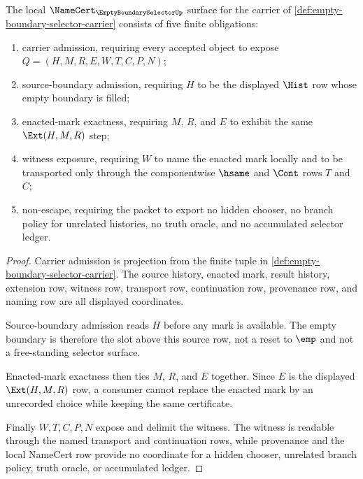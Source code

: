 \begin{theorem}
\label{thm:empty-boundary-selector-namecert-obligations}
The local $\NameCert_{\EmptyBoundarySelectorUp}$ surface for the carrier of \autoref{def:empty-boundary-selector-carrier} consists of five finite obligations:
\begin{enumerate}
\item carrier admission, requiring every accepted object to expose $Q=(H,M,R,E,W,T,C,P,N)$;
\item source-boundary admission, requiring $H$ to be the displayed $\Hist$ row whose empty boundary is filled;
\item enacted-mark exactness, requiring $M$, $R$, and $E$ to exhibit the same $\Ext(H,M,R)$ step;
\item witness exposure, requiring $W$ to name the enacted mark locally and to be transported only through the componentwise $\hsame$ and $\Cont$ rows $T$ and $C$;
\item non-escape, requiring the packet to export no hidden chooser, no branch policy for unrelated histories, no truth oracle, and no accumulated selector ledger.
\end{enumerate}
\end{theorem}
\begin{proof}
Carrier admission is projection from the finite tuple in \autoref{def:empty-boundary-selector-carrier}. The source history, enacted mark, result history, extension row, witness row, transport row, continuation row, provenance row, and naming row are all displayed coordinates.

Source-boundary admission reads $H$ before any mark is available. The empty boundary is therefore the slot above this source row, not a reset to $\emp$ and not a free-standing selector surface.

Enacted-mark exactness then ties $M$, $R$, and $E$ together. Since $E$ is the displayed $\Ext(H,M,R)$ row, a consumer cannot replace the enacted mark by an unrecorded choice while keeping the same certificate.

Finally $W,T,C,P,N$ expose and delimit the witness. The witness is readable through the named transport and continuation rows, while provenance and the local NameCert row provide no coordinate for a hidden chooser, unrelated branch policy, truth oracle, or accumulated ledger.
\end{proof}

